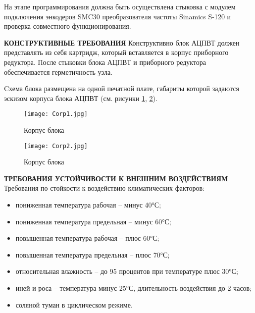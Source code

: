     На этапе программирования должна быть осуществлена стыковка с модулем подключения энкодеров SMC30 преобразователя частоты Sinamics S-120 и проверка совместного функционирования. 

\textbf{КОНСТРУКТИВНЫЕ ТРЕБОВАНИЯ}
        Конструктивно блок АЦПВТ должен представлять из себя картридж, который вставляется в корпус приборного редуктора. 
        После стыковки блока АЦПВТ и приборного редуктора обеспечивается герметичность узла. 

        Cхема блока размещена на одной печатной плате, габариты которой задаются эскизом корпуса блока АЦПВТ (см. рисунки \ref{Corp1}, \ref{Corp2}). 

        \begin{figure}[!t]
          \centering
          \texttt{[image: Corp1.jpg]} 
          \caption{Корпус блока}
          \label{Corp1}
        \end{figure}

        \begin{figure}[!t]
          \centering
          \texttt{[image: Corp2.jpg]} 
          \caption{Корпус блока}
          \label{Corp2}
        \end{figure}

  \textbf{ТРЕБОВАНИЯ УСТОЙЧИВОСТИ К ВНЕШНИМ ВОЗДЕЙСТВИЯМ}
  Требования по стойкости к воздействию климатических факторов:
\begin{itemize}

  \item пониженная температура рабочая – минус 40°С;

  \item пониженная температура предельная – минус 60°С;

 \item повышенная температура рабочая – плюс 60°С;

 \item повышенная температура предельная – плюс 70°С;

 \item относительная влажность – до 95 процентов при температуре плюс 30°С;

 \item иней и роса – температура минус 25°С, длительность воздействия до 2 часов;

 \item соляной туман в циклическом режиме.

\end{itemize}


